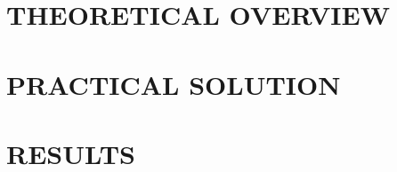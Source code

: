 \documentclass[a4paper,12pt]{extarticle} %
\begin{document}
    
    \pagebreak

    
    \pagebreak

    \tableofcontents{}
    \pagebreak

    \label{sec:introduction}
    

    \newpage
    \section{THEORETICAL OVERVIEW}
    \label{sec:theory}
    

    \newpage
    \section{PRACTICAL SOLUTION}
    \label{sec:practice}
    

    \newpage
    \section{RESULTS}
    \label{sec:results}
    

    \newpage
    \label{sec:conclusion}
    

    \newrefcontext[sorting=ntvy]
    \printbibliography[env=gostbibliography]
\end{document}
